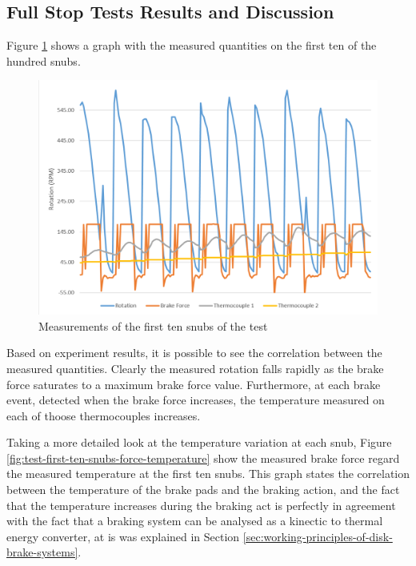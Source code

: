 \subsection{Full Stop Tests Results and Discussion}\label{ssec:full-stop-test-results}

		Figure \ref{fig:test-first-ten-snubs} shows a graph with the measured quantities on the first ten of the hundred snubs.

		\begin{figure}[htbp]
				\centering
				\includegraphics[width=.8\textwidth]{figuras/fig-test-first-ten-snubs}
				\caption{Measurements of the first ten snubs of the test}
				\label{fig:test-first-ten-snubs}
		\end{figure}

		Based on experiment results, it is possible to see the correlation between the measured quantities. Clearly the measured rotation falls rapidly as the brake force saturates to a maximum brake force value. Furthermore, at each brake event, detected when the brake force increases, the temperature measured on each of thoose thermocouples increases.
		\par

		Taking a more detailed look at the temperature variation at each snub, Figure \ref{fig:test-first-ten-snubs-force-temperature} show the measured brake force regard the measured temperature at the first ten snubs. This graph states the correlation between the temperature of the brake pads and the braking action, and the fact that the temperature increases during the braking act is perfectly in agreement with the fact that a braking system can be analysed as a kinectic to thermal energy converter, at is was explained in Section \ref{sec:working-principles-of-disk-brake-systems}.

